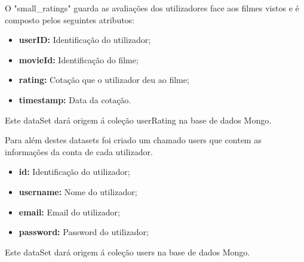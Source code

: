 \par O "small\_ratings" guarda as avaliações dos utilizadores face aos filmes vistos e é composto pelos seguintes atributos:

\begin{itemize}
    \item \textbf{userID:} Identificação do utilizador;
    \item \textbf{movieId:} Identificação do filme;
    \item \textbf{rating:} Cotação que o utilizador deu ao filme;
    \item \textbf{timestamp:} Data da cotação.
\end{itemize}
Este dataSet dará origem á coleção userRating na base de dados Mongo.    


\par Para além destes datasets foi criado um chamado users que contem as informações da conta de cada utilizador.

\begin{itemize}
    \item \textbf{id:} Identificação do utilizador;
    \item \textbf{username:} Nome do utilizador;
    \item \textbf{email:} Email do utilizador;
    \item \textbf{password:} Password do utilizador;
\end{itemize}

Este dataSet dará origem á coleção users na base de dados Mongo.    

\newpage
